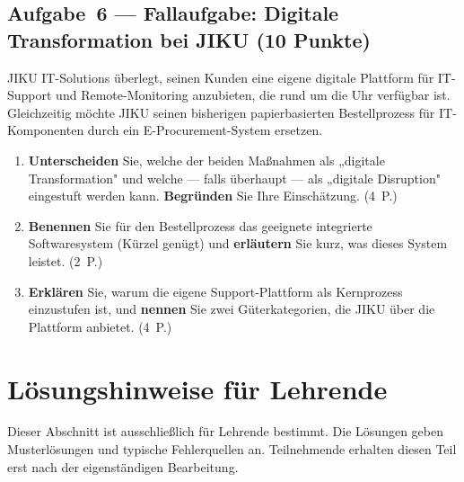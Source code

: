 \documentclass[11pt, a4paper]{article}
\begin{document}
\subsection*{Aufgabe~6 --- Fallaufgabe: Digitale Transformation bei JIKU (10 Punkte)}

JIKU IT-Solutions überlegt, seinen Kunden eine eigene digitale Plattform für IT-Support
und Remote-Monitoring anzubieten, die rund um die Uhr verfügbar ist. Gleichzeitig möchte
JIKU seinen bisherigen papierbasierten Bestellprozess für IT-Komponenten durch ein
E-Procurement-System ersetzen.

\begin{enumerate}[label=(\alph*)]
  \item \textbf{Unterscheiden} Sie, welche der beiden Maßnahmen als „digitale
  Transformation" und welche --- falls überhaupt --- als „digitale Disruption" eingestuft
  werden kann. \textbf{Begründen} Sie Ihre Einschätzung. \hfill (4~P.)

  \vspace{6cm}

  \item \textbf{Benennen} Sie für den Bestellprozess das geeignete integrierte
  Softwaresystem (Kürzel genügt) und \textbf{erläutern} Sie kurz, was dieses System
  leistet. \hfill (2~P.)

  \vspace{4cm}

  \item \textbf{Erklären} Sie, warum die eigene Support-Plattform als Kernprozess
  einzustufen ist, und \textbf{nennen} Sie zwei Güterkategorien, die JIKU über die
  Plattform anbietet. \hfill (4~P.)

  \vspace{5cm}
\end{enumerate}

\newpage
\section*{Lösungshinweise für Lehrende}
\label{loesungen}

\begin{merksatz}[title={\bfseries Hinweis zur Nutzung}]
Dieser Abschnitt ist ausschließlich für Lehrende bestimmt. Die Lösungen geben
Musterlösungen und typische Fehlerquellen an. Teilnehmende erhalten diesen Teil
erst nach der eigenständigen Bearbeitung.
\end{merksatz}
\end{document}
